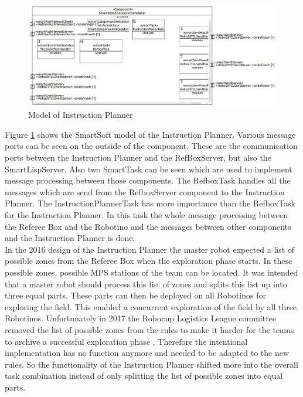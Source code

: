 \begin{figure}[h]
\centering
\includegraphics[scale=0.25]{pic/SmartRobotinoInstructionPlaner.JPG}
\caption{Model of Instruction Planner}
\label{fig:i_overview}
\end{figure}


Figure \ref{fig:i_overview} shows the SmartSoft model of the Instruction Planner. Various message ports can be seen on the outside of the component. These are the communication ports between the Instruction Planner and the RefBoxServer, but also the SmartLispServer. Also two SmartTask can be seen which are used to implement message processing between those components. The RefboxTask handles all the messages which are send from the RefboxServer component to the Instruction Planner. The InstructionPlannerTask has more importance than the RefboxTask for the Instruction Planner. In this task the whole message processing between the Referee Box and the Robotino and the messages between other components and the Instruction Planner is done. \\


In the 2016 design of the Instruction Planner the master robot expected a list of possible zones from the Referee Box when the exploration phase starts. In these possible zones, possible MPS stations of the team can be located. It was intended that a master robot should process this list of zones and splits this list up into three equal parts. These parts can then be deployed on all Robotinos for exploring the field. This enabled a concurrent exploration of the field by all three Robotinos.  Unfortunately in 2017 the Robocup Logistics League committee removed the list of possible zones from the rules to make it harder for the teams to archive a successful exploration phase \cite{RCLL2017}. Therefore the intentional implementation has no function anymore and needed to be adapted to the new rules. So the functionality of the Instruction Planner shifted more into the overall task combination instead of only splitting the list of possible zones into equal parts. \\



